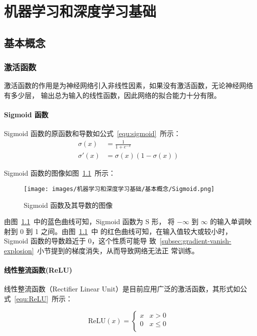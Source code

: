 \part{机器学习和深度学习基础}

\chapter{基本概念}

\section{激活函数}

激活函数的作用是为神经网络引入非线性因素，如果没有激活函数，无论神经网络有多少层，
输出总为输入的线性函数，因此网络的拟合能力十分有限。

\subsection{Sigmoid 函数}
\label{subsec:Sigmoid}

Sigmoid 函数的原函数和导数如公式~\ref{equ:sigmoid}~所示：
\begin{align}
  \label{equ:sigmoid}
  \sigma(x) & = \frac{1}{1 + e^{-x}} \\
  \sigma'(x) & = \sigma(x) (1-\sigma(x))
\end{align}

Sigmoid 函数的图像如图~\ref{fig:sigmoid}~所示：

\begin{figure}[ht]
  \centering
  \texttt{[image: images/机器学习和深度学习基础/基本概念/Sigmoid.png]}
  \caption{Sigmoid 函数及其导数的图像}
  \label{fig:sigmoid}
\end{figure}

由图~\ref{fig:sigmoid}~中的蓝色曲线可知，Sigmoid 函数为 S 形，
将 $-\infty$ 到 $\infty$ 的输入单调映射到 0 到 1 之间。由图~\ref{fig:sigmoid}~中
的红色曲线可知，在输入值较大或较小时，Sigmoid 函数的导数趋近于 0，这个性质可能导
致~\ref{subsec:gradient-vanish-explosion}~小节提到的梯度消失，从而导致网络无法正
常训练。

\subsection{线性整流函数(ReLU)}

线性整流函数（Rectifier Linear Unit）是目前应用广泛的激活函数，其形式如公
式~\ref{equ:ReLU}~所示：

\begin{equation}
  \label{equ:ReLU}
  \mathrm{ReLU}(x) = \left\{
    \begin{array}{lr}
      x & x > 0 \\
      0 & x \leq 0 \\
    \end{array}
  \right.
\end{equation}

